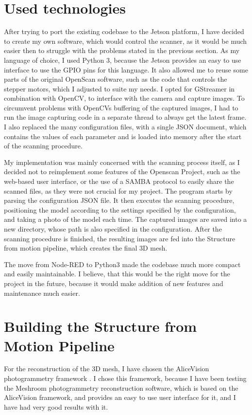 \section{Used technologies}
After trying to port the existing codebase to the Jetson platform, I have decided to create my own software, which would control the scanner, as it would be much easier then to struggle with the problems stated in the previous section.
As my language of choice, I used Python 3, because the Jetson provides an easy to use interface to use the GPIO pins for this language.
It also allowed me to reuse some parts of the original OpenScan software, such as the code that controls the stepper motors, which I adjusted to suite my needs.
I opted for GStreamer in combination with OpenCV, to interface with the camera and capture images.
To circumvent problems with OpenCVs buffering of the captured images, I had to run the image capturing code in a separate thread to always get the latest frame.
I also replaced the many configuration files, with a single JSON document, which contains the values of each parameter and is loaded into memory after the start of the scanning procedure.

My implementation was mainly concerned with the scanning process itself, as I decided not to reimplement some features of the Openscan Project, such as the web-based user interface, or the use of a SAMBA protocol to easily share the scanned files, as they were not crucial for my project.
The program starts by parsing the configuration JSON file.
It then executes the scanning procedure, positioning the model according to the settings specified by the configuration, and taking a photo of the model each time.
The captured images are saved into a new directory, whose path is also specified in the configuration.
After the scanning procedure is finished, the resulting images are fed into the Structure from motion pipeline, which creates the final 3D mesh.

The move from Node-RED to Python3 made the codebase much more compact and easily maintainable.
I believe, that this would be the right move for the project in the future, because it would make addition of new features and maintenance much easier.

\section{Building the Structure from Motion Pipeline}

For the reconstruction of the 3D mesh, I have chosen the AliceVision photogrammetry framework \cite{Moulon2012, Jancosek2011}.
I chose this framework, because I have been testing the Meshroom photogrammetry reconstruction software, which is based on the AliceVision framework, and provides an easy to use user interface for it, and I have had very good results with it.

